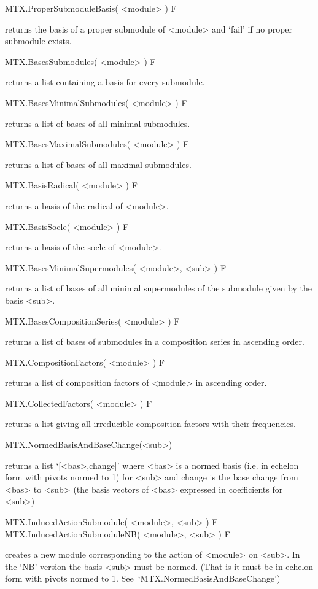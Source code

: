 \>MTX.ProperSubmoduleBasis( <module> ) F

returns the basis of a proper submodule of <module> and `fail' if no proper
submodule exists.

\>MTX.BasesSubmodules( <module> ) F

returns a list containing a basis for every submodule.

\>MTX.BasesMinimalSubmodules( <module> ) F

returns a list of bases of all minimal submodules.

\>MTX.BasesMaximalSubmodules( <module> ) F

returns a list of bases of all maximal submodules.

\>MTX.BasisRadical( <module> ) F

returns a basis of the radical of <module>.

\>MTX.BasisSocle( <module> ) F

returns a basis of the socle of <module>.

\>MTX.BasesMinimalSupermodules( <module>, <sub> ) F

returns a list of bases of all minimal supermodules of the submodule given by
the basis <sub>.

\>MTX.BasesCompositionSeries( <module> ) F

returns a list of bases of submodules in a composition series in ascending
order.

\>MTX.CompositionFactors( <module> ) F

returns a list of composition factors of <module> in ascending order.

\>MTX.CollectedFactors( <module> ) F

returns a list giving all irreducible composition factors with their
frequencies.


\>MTX.NormedBasisAndBaseChange(<sub>)

returns a list `[<bas>,change]' where <bas> is a normed basis (i.e. in
echelon form with pivots normed to 1) for <sub> and change is the base change
from <bas> to <sub> (the basis vectors of <bas> expressed in coefficients for
<sub>)


\>MTX.InducedActionSubmodule( <module>, <sub> ) F
\>MTX.InducedActionSubmoduleNB( <module>, <sub> ) F

creates a new module corresponding to the action of <module> on <sub>. In
the `NB' version the basis <sub> must be normed. (That is it must be in
echelon form with pivots normed to 1. See~`MTX.NormedBasisAndBaseChange')

